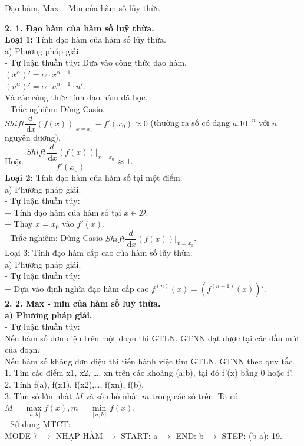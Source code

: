 \begin{dang}{Đạo hàm, Max – Min của hàm số lũy thừa}
\end{dang}
\textbf{2. 1. Đạo hàm của hàm số luỹ thừa.}\\
\textbf{Loại 1:} Tính đạo hàm của hàm số lũy thừa.\\
a) Phương pháp giải.\\
- Tự luận thuần túy: Dựa vào công thức đạo hàm.\\
$\left(x^{\alpha}\right)'=\alpha\cdot x^{\alpha-1}$.\\
$\left(u^{\alpha}\right)'=\alpha\cdot u^{\alpha-1}\cdot u'$.\\
Và các công thức tính đạo hàm đã học.\\
- Trắc nghiệm: Dùng Casio.\\
$Shift\dfrac{d}{\mathrm{\,d}x} (f(x))\bigg|_{x=x_0}-f'(x_0)\approx 0$ (thường ra số có dạng $a.10^{-n}$ với $n$ nguyên dương).\\
Hoặc $\dfrac{Shift\dfrac{d}{\mathrm{\,d}x}{(f(x))}\bigg|_{x=x_0}}{f'(x_0)}\approx 1$.\\
\textbf{Loại 2:} Tính đạo hàm của hàm số tại một điểm.\\
a) Phương pháp giải.\\
- Tự luận thuần túy:\\
+ Tính đạo hàm của hàm số tại $x\in \mathscr{D}$.\\
+ Thay $x=x_0$ vào $f'(x)$.\\
- Trắc nghiệm: Dùng Casio $Shift\dfrac{d}{\mathrm{\,d}x} (f(x))\bigg|_{x=x_0}$.\\
Loại 3: Tính đạo hàm cấp cao của hàm số lũy thừa.\\
a) Phương pháp giải.\\
- Tự luận thuần túy:\\
+ Dựa vào định nghĩa đạo hàm cấp cao $f^{(n)}(x)=\left(f^{(n-1)}(x)\right)'$.\\
\textbf{2. 2. Max - min của hàm số luỹ thừa.}\\
\textbf{a) Phương pháp giải.}\\
- Tự luận thuần túy:\\
Nếu hàm số đơn điệu trên một đoạn thì GTLN, GTNN đạt được tại các đầu mút của đoạn.\\
Nếu hàm số không đơn điệu thì tiến hành việc tìm GTLN, GTNN theo quy tắc.\\
1. Tìm các điểm x1, x2, …, xn trên các khoảng (a;b), tại đó f'(x) bằng 0 hoặc f'.\\
2. Tính f(a), f(x1), f(x2),…, f(xn), f(b).\\
3. Tìm số lớn nhất $M$ và số nhỏ nhất $m$ trong các số trên. Ta có\\
	$M=\max\limits_{[a;b]} f(x),m=\min\limits_{[a;b]} f(x)$.\\
- Sử dụng MTCT:\\
MODE 7 $\to$ NHẬP HÀM $\to$ START: a $\to$ END: b $\to$ STEP: (b-a): 19.
